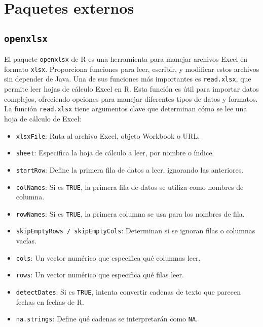 \documentclass[12pt]{report}\usepackage[]{graphicx}\usepackage[dvipsnames]{xcolor}
\begin{document}
 	
 	\chapter{Paquetes externos}\label{ap:PaquetesExternos}
 	
	 	\section{\texttt{openxlsx}}
	 	
		 	El paquete \texttt{openxlsx} de R es una herramienta para manejar archivos Excel en formato \texttt{xlsx}. Proporciona funciones para leer, escribir, y modificar estos archivos sin depender de Java. Una de sus funciones más importantes es \texttt{read.xlsx}, que permite leer hojas de cálculo Excel en R. Esta función es útil para importar datos complejos, ofreciendo opciones para manejar diferentes tipos de datos y formatos.\\
		 	
		 	La función \texttt{read.xlsx} tiene argumentos clave que determinan cómo se lee una hoja de cálculo de Excel:
		 	
		 	\begin{itemize}
		 		\item \texttt{xlsxFile}: Ruta al archivo Excel, objeto Workbook o URL.
		 		\item \texttt{sheet}: Especifica la hoja de cálculo a leer, por nombre o índice.
		 		\item \texttt{startRow}: Define la primera fila de datos a leer, ignorando las anteriores.
		 		\item \texttt{colNames}: Si es \texttt{TRUE}, la primera fila de datos se utiliza como nombres de columna.
		 		\item \texttt{rowNames}: Si es \texttt{TRUE}, la primera columna se usa para los nombres de fila.
		 		\item \texttt{skipEmptyRows / skipEmptyCols}: Determinan si se ignoran filas o columnas vacías.
		 		\item \texttt{cols}: Un vector numérico que especifica qué columnas leer.
		 		\item \texttt{rows}: Un vector numérico que especifica qué filas leer.
		 		\item \texttt{detectDates}: Si es \texttt{TRUE}, intenta convertir cadenas de texto que parecen fechas en fechas de R.
		 		\item \texttt{na.strings}: Define qué cadenas se interpretarán como \texttt{NA}.
		 	\end{itemize}
		 	
\end{document}
